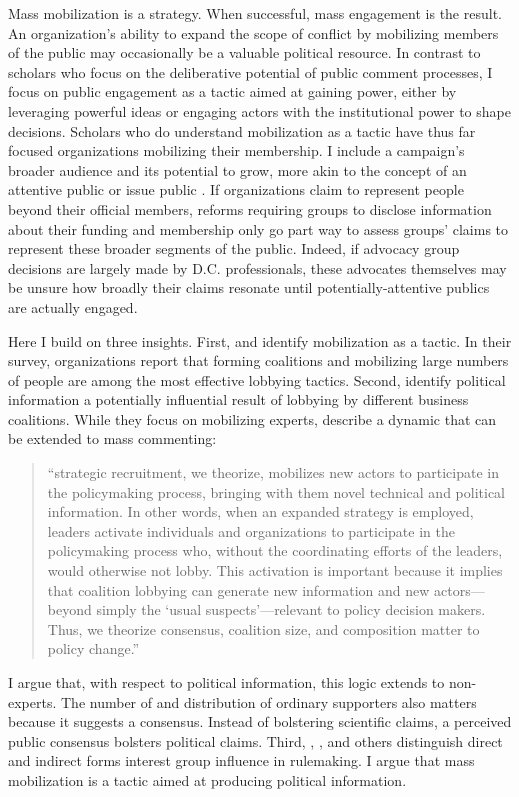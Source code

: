Mass mobilization is a strategy. When successful, mass engagement is the result. An organization's ability to expand the scope of conflict by mobilizing members of the public may occasionally be a valuable political resource. 
In contrast to scholars who focus on the deliberative potential of public comment processes, I focus on public engagement as a tactic aimed at gaining power, either by leveraging powerful ideas or engaging actors with the institutional power to shape decisions.
Scholars who do understand mobilization as a tactic \citep{Furlong1997, Kerwin2011} have thus far focused organizations mobilizing their membership. %
I include a campaign's broader audience and its potential to grow, more akin to the concept of an attentive public \citep{Key1961} or issue public \citep{Converse1964}. If organizations claim to represent people beyond their official members, 
reforms requiring groups to disclose information about their funding and membership \citep{Seifter2016UCLA} only go part way to assess groups' claims to represent these broader segments of the public. Indeed, if advocacy group decisions are largely made by D.C. professionals, these advocates themselves may be unsure how broadly their claims resonate until potentially-attentive publics are actually engaged.

Here I build on three insights. First, \citet{Kerwin2011} and \citet{Furlong1997} identify mobilization as a tactic. In their survey, organizations report that forming coalitions and mobilizing large numbers of people are among the most effective lobbying tactics. Second, \citet{Nelson2012} identify political information a potentially influential result of lobbying by different business coalitions. While they focus on mobilizing experts, \citet{Nelson2012} describe a dynamic that can be extended to mass commenting: 
\begin{quote}
``strategic recruitment, we theorize, mobilizes new actors to participate in the policymaking process, bringing with them novel technical and political information. In other words, when an expanded strategy is employed, leaders activate individuals and organizations to participate in the policymaking process who, without the coordinating efforts of the leaders, would otherwise not lobby. This activation is important because it implies that coalition lobbying can generate new information and new actors---beyond simply the `usual suspects'---relevant to policy decision makers. Thus, we theorize consensus, coalition size, and composition matter to policy change.'' 
\end{quote}
I argue that, with respect to political information, this logic extends to non-experts. The number of and distribution of ordinary supporters also matters because it suggests a  consensus. Instead of bolstering scientific claims, a perceived public consensus bolsters political claims. 
Third, \citet{Furlong1998}, \citet{Yackee2006JPART}, and others distinguish direct and indirect forms interest group influence in rulemaking. I argue that mass mobilization is a tactic aimed at producing political information.%


